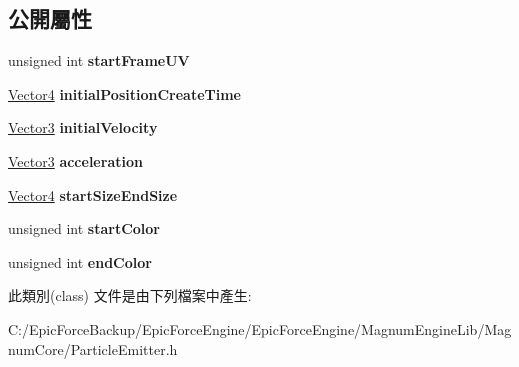 \subsection*{公開屬性}
\begin{DoxyCompactItemize}
\item 
unsigned int {\bfseries start\+Frame\+UV}\hypertarget{class_magnum_1_1_particle_emitter_1_1_vertex_ac04927356d988a08db595633e4573e32}{}\label{class_magnum_1_1_particle_emitter_1_1_vertex_ac04927356d988a08db595633e4573e32}

\item 
\hyperlink{class_magnum_1_1_vector4}{Vector4} {\bfseries initial\+Position\+Create\+Time}\hypertarget{class_magnum_1_1_particle_emitter_1_1_vertex_a21df9c7a28478a433fb7daaf7eb16557}{}\label{class_magnum_1_1_particle_emitter_1_1_vertex_a21df9c7a28478a433fb7daaf7eb16557}

\item 
\hyperlink{class_magnum_1_1_vector3}{Vector3} {\bfseries initial\+Velocity}\hypertarget{class_magnum_1_1_particle_emitter_1_1_vertex_aea844678d080979770bceefef3a7ab38}{}\label{class_magnum_1_1_particle_emitter_1_1_vertex_aea844678d080979770bceefef3a7ab38}

\item 
\hyperlink{class_magnum_1_1_vector3}{Vector3} {\bfseries acceleration}\hypertarget{class_magnum_1_1_particle_emitter_1_1_vertex_ad2fe5793b17d1444b2d513201002eb80}{}\label{class_magnum_1_1_particle_emitter_1_1_vertex_ad2fe5793b17d1444b2d513201002eb80}

\item 
\hyperlink{class_magnum_1_1_vector4}{Vector4} {\bfseries start\+Size\+End\+Size}\hypertarget{class_magnum_1_1_particle_emitter_1_1_vertex_a74ebc04537d5f276bd2e7364c5a8d8ea}{}\label{class_magnum_1_1_particle_emitter_1_1_vertex_a74ebc04537d5f276bd2e7364c5a8d8ea}

\item 
unsigned int {\bfseries start\+Color}\hypertarget{class_magnum_1_1_particle_emitter_1_1_vertex_a4ad24b84e1683aac74a1002171123725}{}\label{class_magnum_1_1_particle_emitter_1_1_vertex_a4ad24b84e1683aac74a1002171123725}

\item 
unsigned int {\bfseries end\+Color}\hypertarget{class_magnum_1_1_particle_emitter_1_1_vertex_afd5b529af990a70d345af1aba3a01073}{}\label{class_magnum_1_1_particle_emitter_1_1_vertex_afd5b529af990a70d345af1aba3a01073}

\end{DoxyCompactItemize}


此類別(class) 文件是由下列檔案中產生\+:\begin{DoxyCompactItemize}
\item 
C\+:/\+Epic\+Force\+Backup/\+Epic\+Force\+Engine/\+Epic\+Force\+Engine/\+Magnum\+Engine\+Lib/\+Magnum\+Core/Particle\+Emitter.\+h\end{DoxyCompactItemize}
